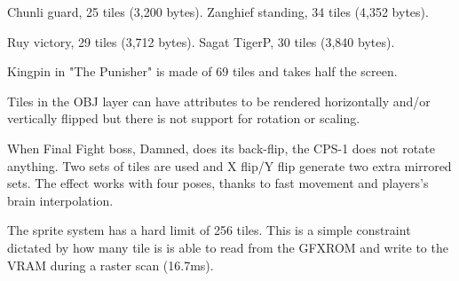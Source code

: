 \begin{minipage}[t]{0.453\linewidth}
\end{minipage}%
\hfill%
\begin{minipage}[t]{0.53\linewidth}
\end{minipage}



Chunli guard, 25 tiles (3,200 bytes). Zanghief standing, 34 tiles (4,352 bytes). 

\begin{minipage}[t]{0.3\linewidth}
\end{minipage}%
\hfill%
\begin{minipage}[t]{0.53\linewidth}
\end{minipage}

Ruy victory, 29 tiles (3,712 bytes). Sagat TigerP, 30 tiles (3,840 bytes). 




Kingpin in "The Punisher" is made of 69 tiles and takes half the screen.


Tiles in the OBJ layer can have attributes to be rendered horizontally and/or vertically flipped but there is not support for rotation or scaling.

\begin{minipage}[t]{0.535\linewidth}
\end{minipage}%
\hfill%
\begin{minipage}[t]{0.445\linewidth}
\end{minipage}

 When Final Fight boss, Damned, does its back-flip, the CPS-1 does not rotate anything. Two sets of tiles are used and X flip/Y flip generate two extra mirrored sets. The effect works with four poses, thanks to fast movement and players's brain interpolation.


\pagebreak

The sprite system has a hard limit of 256 tiles. This is a simple constraint dictated by how many tile is is able to read from the GFXROM and write to the VRAM during a raster scan (16.7ms).

